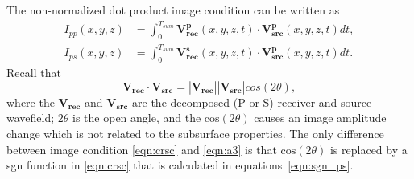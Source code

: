 \documentclass[manuscript,ulem,graphix,revised]{geophysics}
\begin{document}
The non-normalized dot product image condition can be written as
\begin{equation}
\begin{aligned}
I_{pp}(x,y,z)&=\int_0^{T_{sum}}\mathbf{V^p_{rec}}(x,y,z,t)\cdot \mathbf{V^p_{src}}(x,y,z,t)dt,\\
I_{ps}(x,y,z)&=\int_0^{T_{sum}}\mathbf{V^s_{rec}}(x,y,z,t)\cdot \mathbf{V^p_{src}}(x,y,z,t)dt.
\end{aligned}
\label{eqn:dprdt}
\end{equation}
Recall that 
\begin{equation}
\mathbf{V_{rec}}\cdot \mathbf{V_{src}}=|\mathbf{V_{rec}}||\mathbf{V_{src}}|cos(2\theta),
\label{eqn:a3}
\end{equation}
where the $\mathbf{V_{rec}}$ and $\mathbf{V_{src}}$ are the decomposed (P or S) receiver and source wavefield; $2\theta$ is the open angle, and the $\mathrm{cos}(2\theta)$ causes an image amplitude change which is not related to the subsurface properties. The only difference between image condition \ref{eqn:crsc} and \ref{eqn:a3} is that $\mathrm{cos}(2\theta)$ is replaced by a sgn function in \ref{eqn:crsc} that is calculated in equations~\ref{eqn:sgn_ps}.


\newpage


\end{document}
